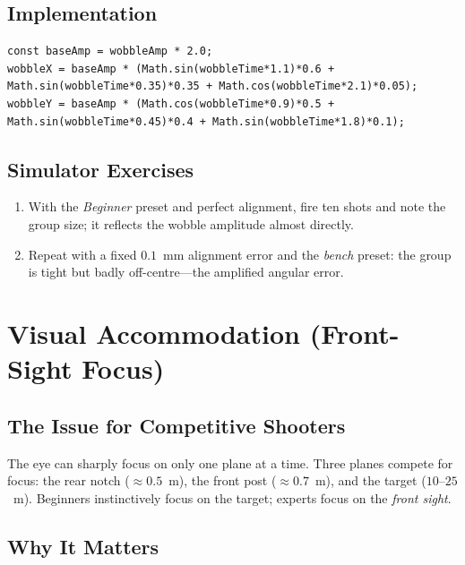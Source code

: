 \documentclass[11pt]{article}
\begin{document}
\subsection{Implementation}

\begin{lstlisting}
const baseAmp = wobbleAmp * 2.0;
wobbleX = baseAmp * (Math.sin(wobbleTime*1.1)*0.6 + Math.sin(wobbleTime*0.35)*0.35 + Math.cos(wobbleTime*2.1)*0.05);
wobbleY = baseAmp * (Math.cos(wobbleTime*0.9)*0.5 + Math.sin(wobbleTime*0.45)*0.4 + Math.sin(wobbleTime*1.8)*0.1);
\end{lstlisting}

\subsection{Simulator Exercises}

\begin{enumerate}[nosep]
  \item With the \emph{Beginner} preset and perfect alignment, fire ten
        shots and note the group size; it reflects the wobble amplitude
        almost directly.
  \item Repeat with a fixed $0.1$~mm alignment error and the \emph{bench}
        preset: the group is tight but badly off-centre---the amplified
        angular error.
\end{enumerate}

\section{Visual Accommodation (Front-Sight Focus)}\label{sec:focus}

\subsection{The Issue for Competitive Shooters}

The eye can sharply focus on only one plane at a time.  Three planes
compete for focus: the rear notch ($\approx 0.5$~m), the front post
($\approx 0.7$~m), and the target ($10$--$25$~m).  Beginners instinctively
focus on the target; experts focus on the \emph{front sight}.

\subsection{Why It Matters}
\end{document}
